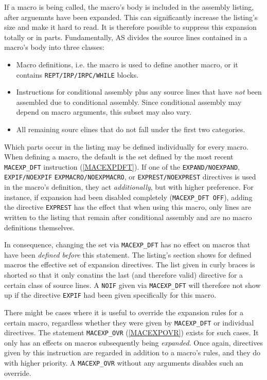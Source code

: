 \documentclass[12pt,twoside]{report}
\newcommand{\tty}[1]{{\tt #1}}
\newcommand{\asname}{{AS}}
\begin{document}
If a macro is being called, the macro's body is included in the assembly
listing, after arguemnts have been expanded.  This can significantly increase
the listing's size and make it hard to read.  It is therefore possible to
suppress this expansion totally or in parts.  Fundamentally, \asname{} divides
the source lines contained in a macro's body into three classes:
\begin{itemize}
\item{Macro definitions, i.e. the macro is used to define another macro,
      or it contains \tty{REPT/IRP/IRPC/WHILE} blocks.}
\item{Instructions for conditional assembly plus any source lines that have
      {\it not} been assembled due to conditional assembly.  Since conditional
      assembly may depend on macro arguments, this subset may also vary.}
\item{All remaining sourc elines that do not fall under the first two
      categories.}
\end{itemize}
Which parts occur in the listing may be defined individually for every macro.
When defining a macro, the default is the set defined by the most recent
\tty{MACEXP\_DFT} instruction (\ref{MACEXPDFT}).  If one of the \tty{EXPAND/NOEXPAND},
\tty{EXPIF/NOEXPIF} \tty{EXPMACRO/NOEXPMACRO}, or \tty{EXPREST/NOEXPREST}
directives is used in the macro's definition, they act {\em additionally},
but with higher preference.  For instance, if expansion had been disabled
completely (\tty{MACEXP\_DFT OFF}), adding the directive \tty{EXPREST} has the
effect that when using this macro, only lines are written to the listing
that remain after conditional assembly and are no macro definitions themselves.

In consequence, changing the set via \tty{MACEXP\_DFT} has no effect on macros
that have been {\it defined before} this statement.  The listing's section shows
for defined macros the effective set of expansion directives.  The list given
in curly braces is shorted so that it only conatins the last (and therefore
valid) directive for a certain class of source lines.  A \tty{NOIF} given
via \tty{MACEXP\_DFT} will therefore not show up if the directive \tty{EXPIF}
had been given specifically for this macro.

There might be cases where it is useful to override the expansion rules for
a certain macro, regardless whether they were given by \tty{MACEXP\_DFT} or
individual directives.  The statement \tty{MACEXP\_OVR} (\ref{MACEXPOVR})
exists for such cases.  It only has an effects on macros subsequently being
{\it expanded}.  Once again, directives given by this instruction are regarded
in addition to a macro's rules, and they do with higher priority.  A \tty{MACEXP\_OVR}
without any arguments disables such an override.
\end{document}
